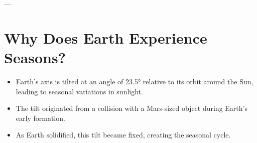 \documentclass[12pt]{article}
\begin{document}
---

\section*{Why Does Earth Experience Seasons?}
\begin{itemize}
    \item Earth’s axis is tilted at an angle of 23.5° relative to its orbit around the Sun, leading to seasonal variations in sunlight.
    \item The tilt originated from a collision with a Mars-sized object during Earth's early formation.
    \item As Earth solidified, this tilt became fixed, creating the seasonal cycle.
\end{itemize}
\end{document}

